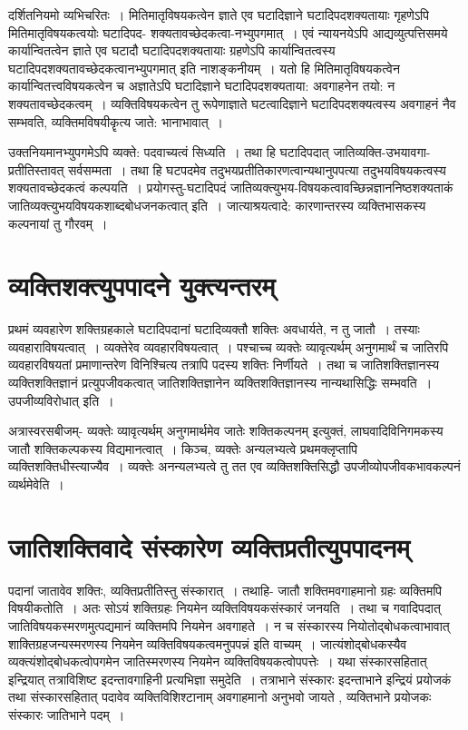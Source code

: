 {दर्शितनियमो व्यभिचरितः~। मितिमातृविषयकत्वेन ज्ञाते एव घटादिज्ञाने घटादिपदशक्यतायाः गृहणेऽपि मितिमातृविषयकत्वयोः घटादिपद- शक्यतावच्छेदकत्वा-नभ्युप\-गमात्~। एवं न्यायनयेऽपि आद्यव्युत्पत्तिसमये कार्यान्वितत्वेन ज्ञाते एव घटादौ घटादिपदशक्यतायाः ग्रहणेऽपि कार्यान्वितत्वस्य घटादिपदशक्यतावच्छेदकत्वानभ्युपगमात् इति नाशङ्कनीयम्~। यतो हि मितिमातृविषयकत्वेन कार्यान्वितत्त्वविषयकत्वेन च अज्ञातेऽपि घटादिज्ञाने घटादिपदशक्यताया: अवगाहनेन तयो: न शक्यतावच्छेदकत्वम्~। व्यक्तिविषयकत्वेन तु रूपेणाज्ञाते घटत्वादिज्ञाने घटादिपदशक्यत्वस्य अवगाहनं नैव सम्भवति, व्यक्तिमविषयीकॄत्य जाते: भानाभावात्~। 

उक्तनियमानभ्युपगमेऽपि व्यक्ते: पदवाच्यत्वं सिध्यति~। तथा हि घटादिपदात् जाति\-व्यक्ति-उभयावगा-प्रतीतिस्तावत् सर्वसम्मता~। तथा हि घटपदमेव तदुभयप्रतीतिकारणत्वान्यथानुपपत्या तदुभयविषयकत्वस्य शक्यतावच्छेदकत्वं कल्पयति~। प्रयोगस्तु-घटादिपदं जातिव्यक्त्युभय-विषयकत्वावच्छिन्नज्ञाननिष्ठशक्यताकं जातिव्यक्त्युभयविषयकशाब्दबोधजनकत्वात् इति~। जात्याश्रयत्वादे: कारणान्तरस्य व्यक्तिभासकस्य कल्पनायां तु गौरवम्~। 

\section*{व्यक्तिशक्त्युपपादने युक्त्यन्तरम्} 

प्रथमं व्यवहारेण शक्तिग्रहकाले घटादिपदानां घटादिव्यक्तौ शक्तिः अवधार्यते, न तु जातौ~। तस्याः व्यवहाराविषयत्वात्~। व्यक्तेरेव व्यवहारविषयत्वात्~। पश्चाच्च व्यक्तेः व्यावृत्यर्थम् अनुगमार्थं च जातिरपि व्यवहारविषयतां प्रमाणान्तरेण विनिश्चित्य तत्रापि पदस्य शक्तिः निर्णीयते~। तथा च जातिशक्तिज्ञानस्य व्यक्तिशक्तिज्ञानं प्रत्युपजीवकत्वात् जातिशक्तिज्ञानेन व्यक्तिशक्तिज्ञानस्य नान्यथासिद्धिः सम्भवति~। उपजीव्यविरोधात् इति~। 

अत्रास्वरसबीजम्- व्यक्तेः व्यावृत्यर्थम् अनुगमार्थमेव जातेः शक्तिकल्पनम् इत्युक्तं, लाघवादिविनिगमकस्य जातौ शक्तिकल्पकस्य विद्यमानत्वात्~। किञ्च, व्यक्तेः अन्यलभ्यत्वे प्रथमक्लृप्तापि व्यक्तिशक्तिधीस्त्याज्यैव~। व्यक्तेः अनन्यलभ्यत्वे तु तत एव व्यक्तिशक्तिसिद्धौ उपजीव्योपजीवकभावकल्पनं व्यर्थमेवेति~। 

\section*{जातिशक्तिवादे संस्कारेण व्यक्तिप्रतीत्युपपादनम्}

पदानां जातावेव शक्तिः, व्यक्तिप्रतीतिस्तु संस्कारात्~। तथाहि- जातौ शक्तिमवगाहमानो ग्रहः व्यक्तिमपि विषयीकतोति~। अतः सोऽयं शक्तिग्रहः नियमेन व्यक्तिविषयकसंस्कारं जनयति~। तथा च गवादिपदात् जातिविषयकस्मरणमुत्पद्यमानं व्यक्तिमपि नियमेन अवगाहते~। न च संस्कारस्य नियोतोद्बोधकत्वाभावात् शाक्तिग्रहजन्यस्मरणस्य नियमेन व्यक्तिविषयकत्वमनुपपन्नं इति वाच्यम्~। जात्यंशोद्बोधकस्यैव व्यक्त्यंशोद्बोधकत्वोपगमेन जातिस्मरणस्य नियमेन व्यक्तिविषयकत्वोपपत्तेः~। यथा संस्कारसहितात् इन्द्रियात् तत्राविशिष्ट इदन्तावगाहिनी प्रत्यभिज्ञा  समुदेति~। तत्राभाने संस्कारः इदन्ताभाने इन्द्रियं प्रयोजकं तथा संस्कारसहितात् पदावेव व्यक्तिविशिश्टानाम्  अवगाहमानो अनुभवो जायते , व्यक्तिभाने प्रयोजकः संस्कारः जातिभाने पदम्~। 

}
